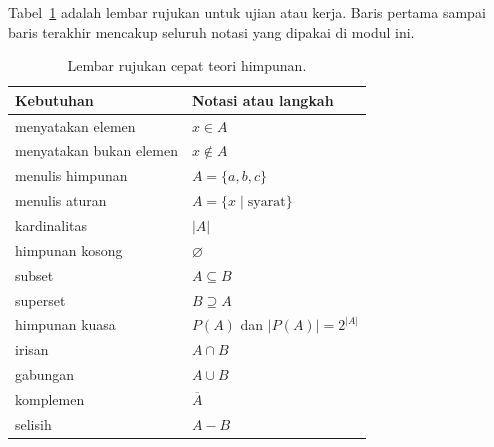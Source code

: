 \documentclass[11pt,a4paper]{article}
\begin{document}
Tabel~\ref{tab:rujukan-cepat} adalah lembar rujukan untuk ujian atau kerja. Baris pertama sampai baris terakhir mencakup seluruh notasi yang dipakai di modul ini.

\begin{table}[H]
	\centering
	\caption{Lembar rujukan cepat teori himpunan.}
	\label{tab:rujukan-cepat}
	\footnotesize
	\begin{tabularx}{\textwidth}{l X}
		\toprule
		Kebutuhan                      & Notasi atau langkah                                                                \\
		\midrule
		menyatakan elemen              & $x \in A$                                                                          \\
		menyatakan bukan elemen        & $x \notin A$                                                                       \\
		menulis himpunan               & $A=\{a,b,c\}$                                                                      \\
		menulis aturan                 & $A=\{x \mid \text{syarat}\}$                                                       \\
		kardinalitas                   & $|A|$                                                                              \\
		himpunan kosong                & $\varnothing$                                                                      \\
		subset                         & $A \subseteq B$                                                                    \\
		superset                       & $B \supseteq A$                                                                    \\
		himpunan kuasa                 & $P(A)$ dan $|P(A)|=2^{|A|}$                                                        \\
		irisan                         & $A \cap B$                                                                         \\
		gabungan                       & $A \cup B$                                                                         \\
		komplemen                      & $\overline{A}$                                                                     \\
		selisih                        & $A-B$                                                                              \\

\end{tabularx}
\end{table}
\end{document}
